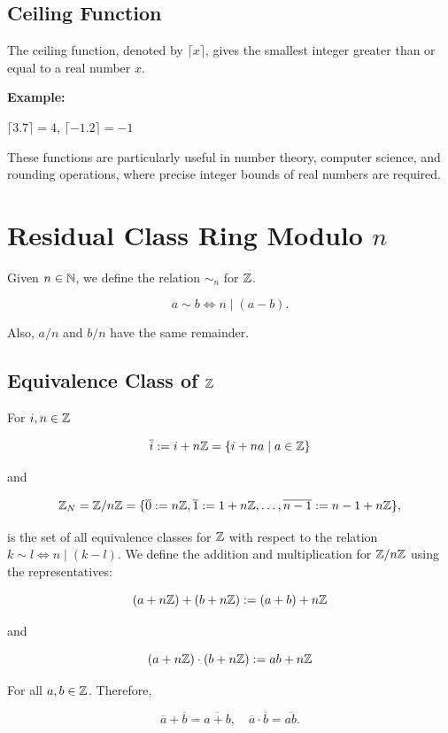\subsection{Ceiling Function}

The ceiling function, denoted by \(\lceil x \rceil\), gives the smallest integer greater than or
equal to a real number \(x\).

\textbf{Example:}

\(\lceil 3.7 \rceil = 4\), \(\lceil -1.2 \rceil = -1\)

These functions are particularly useful in number theory, computer science, and rounding operations, where precise integer bounds of real numbers are required.

\section{Residual Class Ring Modulo \texorpdfstring{\(n\)}{}}

Given \(n \in \mathbb{N}\), we define the relation \(\sim_n\) for \(\mathbb{Z}\).

\[
	a \sim b \iff n \mid (a - b).
\]

Also, \(a / n\) and \(b / n\) have the same remainder.

\subsection{Equivalence Class of \texorpdfstring{\(\mathbb{Z}\)}{}}

For \(i, n \in \mathbb{Z}\)

\[
	\overline{i} := i + n \mathbb{Z} = \{ i + na \mid a \in \mathbb{Z}\}
\]

and

\[
	\mathbb{Z}_N = \mathbb{Z} / n \mathbb{Z} = \{\overline{0}:= n \mathbb{Z}, \overline{1}:= 1 + n \mathbb{Z}, \dots, \overline{n - 1} := n - 1 + n \mathbb{Z} \},
\]

is the set of all equivalence classes for \(\mathbb{Z}\) with respect to the relation
\(k \sim l \iff n \mid (k - l)\). We define the addition and multiplication for \(\mathbb{Z} / n \mathbb{Z}\) using the representatives:

\[
	(a  + n \mathbb{Z}) + (b + n \mathbb{Z}) := (a + b) + n\mathbb{Z}
\]

and

\[
	(a  + n \mathbb{Z}) \cdot (b + n \mathbb{Z}) := ab + n\mathbb{Z}
\]

For all \(a, b \in \mathbb{Z}\). Therefore,

\[
	\overline{a} + \overline{b} = \overline{a + b}, \quad \overline{a} \cdot \overline{b} = \overline{ab}.
\]

